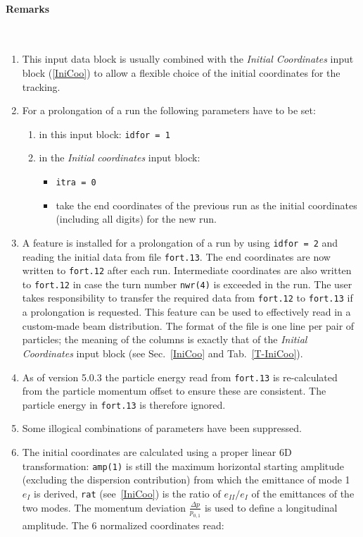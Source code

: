 \paragraph{Remarks}~
\begin{enumerate}
    \item This input data block is usually combined with the \textit{Initial Coordinates} input block (\ref{IniCoo}) to allow a flexible choice of the initial coordinates for the tracking.
    \item For a prolongation of a run the following parameters have to be set:
    \begin{enumerate}
        \item in this input block: \texttt{idfor = 1}
        \item in the \textit{Initial coordinates} input block:
        \begin{itemize}
            \item \texttt{itra = 0}
            \item take the end coordinates of the previous run as the initial coordinates (including all digits) for the new run.
        \end{itemize}
    \end{enumerate}
    \item A feature is installed for a prolongation of a run by using \texttt{idfor = 2} and reading the initial data from file \texttt{fort.13}. The end coordinates are now written to \texttt{fort.12} after each run. Intermediate coordinates are also written to \texttt{fort.12} in case the turn number \texttt{nwr(4)} is exceeded in the run. The user takes responsibility to transfer the required data from \texttt{fort.12} to \texttt{fort.13} if a prolongation is requested. This feature can be used to effectively read in a custom-made beam distribution. The format of the file is one line per pair of particles; the meaning of the columns is exactly that of the \textit{Initial Coordinates} input block (see Sec.~\ref{IniCoo} and Tab.~\ref{T-IniCoo}).
    \item As of version 5.0.3 the particle energy read from \texttt{fort.13} is re-calculated from the particle momentum offset to ensure these are consistent. The particle energy in \texttt{fort.13} is therefore ignored.
    \item Some illogical combinations of parameters have been suppressed.
    \item The initial coordinates are calculated using a proper linear 6D transformation: \texttt{amp(1)} is still the maximum horizontal starting amplitude (excluding the dispersion contribution) from which the emittance of mode 1 $e_I$ is derived, \texttt{rat} (see~\ref{IniCoo}) is the ratio of $e_{II}/e_I$ of the emittances of the two modes. The momentum deviation $\frac{\Delta p}{p_{0,1}}$ is used to define a longitudinal amplitude. The 6 normalized coordinates read:

\end{enumerate}
